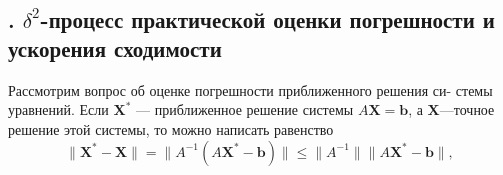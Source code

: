 \documentclass[a4paper, twoside, 12pt]{article}
\begin{document}
\\ \\

\begin{center}
    \section*{. $\delta^{2}$-процесс практической оценки погрешности
и ускорения сходимости
}
\end{center}
\noindent
Рассмотрим вопрос об оценке погрешности приближенного решения си- стемы уравнений. Если 
$\textbf{X}^{*}$ — приближенное решение системы $A\textbf{X} = \textbf{b}$, а $\textbf{X}$—точное решение этой системы, то можно написать равенство
\[
\|\textbf{X}^{*} - \textbf{X}\|=\|A^{-1}(A\textbf{X}^{*}-\textbf{b})\|\leqslant \|A^{-1}\|\|A\textbf{X}^{*}-\textbf{b}\|,
\]
\end{document}
